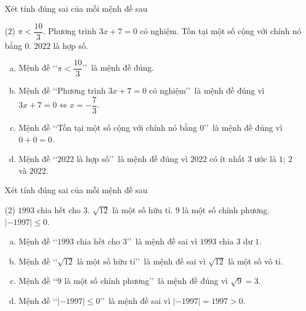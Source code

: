 \begin{baitap}%
	Xét tính đúng sai của mỗi mệnh đề sau
	\begin{tasks}(2)
		\task $\pi<\dfrac{10}{3}$.
		\task Phương trình $3x+7=0$ có nghiệm.
		\task Tồn tại một số cộng với chính nó bằng $0$.
		\task $2022$ là hợp số.
	\end{tasks}

	\loigiai
	{
		\begin{enumerate}[a)]
			\item Mệnh đề \lq\lq $\pi<\dfrac{10}{3}$\rq\rq\ là mệnh đề đúng.
			\item Mệnh đề \lq\lq Phương trình $3x+7=0$ có nghiệm\rq\rq\ là mệnh đề đúng vì $3x+7=0 \Leftrightarrow x=-\dfrac{7}{3}$.
			\item Mệnh đề \lq\lq Tồn tại một số cộng với chính nó bằng $0$\rq\rq\ là mệnh đề đúng vì $0+0=0$.
			\item Mệnh đề \lq\lq $2022$ là hợp số\rq\rq\ là mệnh đề đúng vì $2022$ có ít nhất $3$ ước là $1$; $2$ và $2022$.
		\end{enumerate}
	}
\end{baitap}

\begin{baitap}%
	Xét tính đúng sai của mỗi mệnh đề sau
	\begin{tasks}(2)
		\task $1993$ chia hết cho $3$.
		\task $\sqrt{12}$ là một số hữu tỉ.
		\task $9$ là một số chính phương.
		\task $|-1997|\leqslant0$.
	\end{tasks}
	\loigiai
	{
		\begin{enumerate}[a)]
			\item Mệnh đề \lq\lq $1993$ chia hết cho $3$\rq\rq\ là mệnh đề sai vì $1993$ chia $3$ dư $1$.
			\item Mệnh đề \lq\lq $\sqrt{12}$ là một số hữu tỉ\rq\rq\ là mệnh đề sai vì $\sqrt{12}$ là một số vô tỉ.
			\item Mệnh đề \lq\lq $9$ là một số chính phương\rq\rq\ là mệnh đề đúng vì $\sqrt{9}=3$.
			\item Mệnh đề \lq\lq $|-1997|\leqslant0$\rq\rq\ là mệnh đề sai vì $|-1997|=1997>0$.
		\end{enumerate}
	}
\end{baitap}

